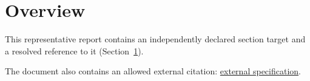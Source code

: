 \documentclass{article}
\begin{document}
\section{Overview}\label{sec:overview}

This representative report contains an independently declared section target
and a resolved reference to it (Section~\ref{sec:overview}).

The document also contains an allowed external citation:
\href{https://example.org/specification}{external specification}.
\end{document}
